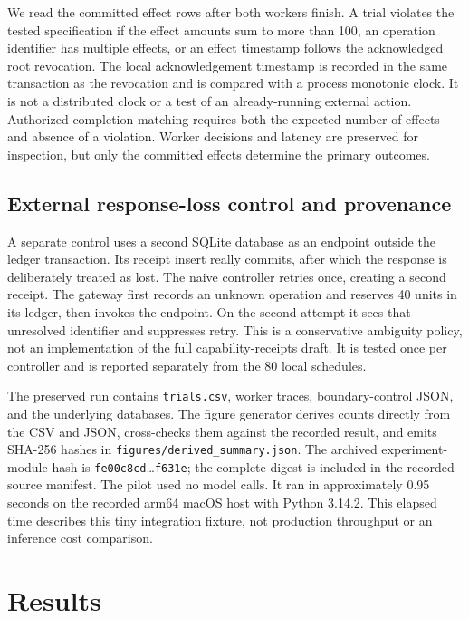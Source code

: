 \documentclass[manuscript,screen,nonacm]{acmart}
\begin{document}
We read the committed effect rows after both workers finish. A trial violates the tested specification if the effect amounts sum to more than 100, an operation identifier has multiple effects, or an effect timestamp follows the acknowledged root revocation. The local acknowledgement timestamp is recorded in the same transaction as the revocation and is compared with a process monotonic clock. It is not a distributed clock or a test of an already-running external action. Authorized-completion matching requires both the expected number of effects and absence of a violation. Worker decisions and latency are preserved for inspection, but only the committed effects determine the primary outcomes.

\subsection{External response-loss control and provenance}
A separate control uses a second SQLite database as an endpoint outside the ledger transaction. Its receipt insert really commits, after which the response is deliberately treated as lost. The naive controller retries once, creating a second receipt. The gateway first records an unknown operation and reserves 40 units in its ledger, then invokes the endpoint. On the second attempt it sees that unresolved identifier and suppresses retry. This is a conservative ambiguity policy, not an implementation of the full capability-receipts draft. It is tested once per controller and is reported separately from the 80 local schedules.

The preserved run contains \texttt{trials.csv}, worker traces, boundary-control JSON, and the underlying databases. The figure generator derives counts directly from the CSV and JSON, cross-checks them against the recorded result, and emits SHA-256 hashes in \texttt{figures/derived\_summary.json}. The archived experiment-module hash is \texttt{fe00c8cd}\ldots\texttt{f631e}; the complete digest is included in the recorded source manifest. The pilot used no model calls. It ran in approximately 0.95 seconds on the recorded arm64 macOS host with Python 3.14.2. This elapsed time describes this tiny integration fixture, not production throughput or an inference cost comparison.

\section{Results}
\end{document}
